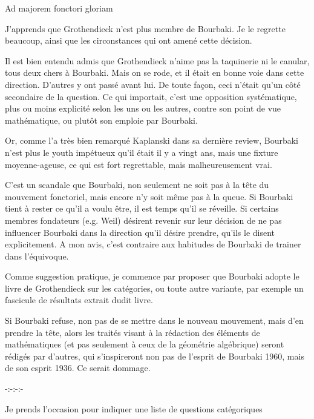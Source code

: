 \begin{center}Ad majorem fonctori gloriam\end{center}

J'apprends que Grothendieck n'est plus membre de Bourbaki. Je le regrette
beaucoup, ainsi que les circonstances qui ont amené cette décision.

Il est bien entendu admis que Grothendieck n'aime pas la taquinerie ni le
canular, tous deux chers à Bourbaki. Mais on se rode, et il était en bonne
voie dans cette direction. D'autres y ont passé avant lui. De toute façon,
ceci n'était qu'un côté secondaire de la question. Ce qui importait, c'est
une opposition systématique, plus ou moins explicité selon les uns ou les
autres, contre son point de vue mathématique, ou plutôt son emploie par
Bourbaki.

Or, comme l'a très bien remarqué Kaplanski dans sa dernière review,
Bourbaki n'est plus le youth impétueux qu'il était il y a vingt ans, mais une
fixture moyenne-ageuse, ce qui est fort regrettable, mais malheureusement vrai.

C'est un scandale que Bourbaki, non seulement ne soit pas à la tête du
mouvement fonctoriel, mais encore n'y soit même pas à la queue. Si Bourbaki
tient à rester ce qu'il a voulu être, il est temps qu'il se réveille. Si
certains membres fondateurs (e.g. Weil) désirent revenir sur leur décision de
ne pas influencer Bourbaki dans la direction qu'il désire prendre, qu'ils le
disent explicitement. A mon avis, c'est contraire aux habitudes de Bourbaki
de trainer dans l'équivoque.

Comme suggestion pratique, je commence par proposer que Bourbaki adopte
le livre de Grothendieck sur les catégories, ou toute autre variante, par
exemple un fascicule de résultats extrait dudit livre.

Si Bourbaki refuse, non pas de se mettre dans le nouveau mouvement, mais
d'en prendre la tête, alors les traités visant à la rédaction des éléments de
mathématiques (et pas seulement à ceux de la géométrie algébrique) seront
rédigés par d'autres, qui s'inspireront non pas de l'esprit de Bourbaki 1960,
mais de son esprit 1936. Ce serait dommage.

\begin{center}-:-:-:-\end{center}

Je prends l'occasion pour indiquer une liste de questions catégoriques
